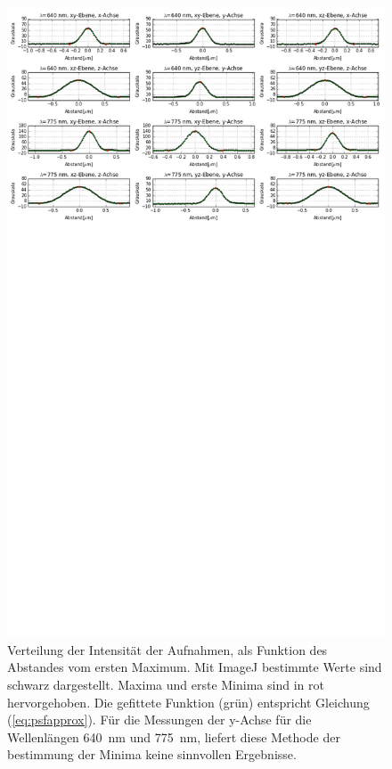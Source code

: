 \begin{figure}
	\centering
	\includegraphics[trim= 0 950 0 0, width=\textwidth]{plots/goldbeads.png}
	\caption{Verteilung der Intensität der Aufnahmen, als Funktion des Abstandes vom ersten Maximum. Mit ImageJ bestimmte Werte sind schwarz dargestellt. 
		Maxima und erste Minima sind in rot hervorgehoben. 
		Die gefittete Funktion (grün) entspricht Gleichung (\ref{eq:psfapprox}). 
		Für die Messungen der y-Achse für die Wellenlängen 640~nm und 775~nm, liefert diese Methode der bestimmung der Minima keine sinnvollen Ergebnisse.
	}
\end{figure}

